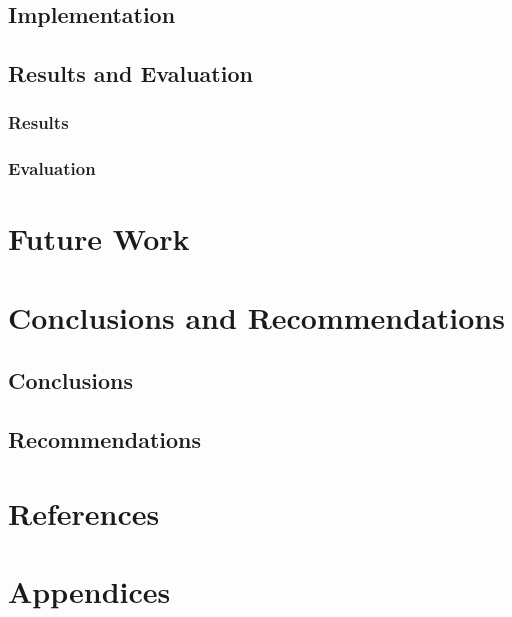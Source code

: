 \documentclass[12pt, a4paper]{report}
\begin{document}
\section{Implementation}

\section{Results and Evaluation}

\subsection{Results}

\subsection{Evaluation}

\newpage

 \chapter{Future Work}

\newpage

 \chapter{Conclusions and Recommendations}

\section{Conclusions}

\newpage
\section{Recommendations}

\newpage

\chapter*{References}

\newpage

\chapter*{Appendices}

\end{document}

